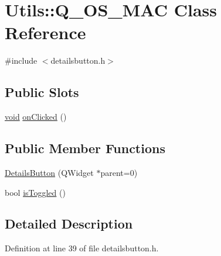 \hypertarget{class_utils_1_1_q___o_s___m_a_c}{\section{\-Utils\-:\-:\-Q\-\_\-\-O\-S\-\_\-\-M\-A\-C \-Class \-Reference}
\label{class_utils_1_1_q___o_s___m_a_c}
}


{\ttfamily \#include $<$detailsbutton.\-h$>$}

\subsection*{\-Public \-Slots}
\begin{DoxyCompactItemize}
\item 
\hyperlink{group___u_a_v_objects_plugin_ga444cf2ff3f0ecbe028adce838d373f5c}{void} \hyperlink{class_utils_1_1_q___o_s___m_a_c_a9ceef4b11c2dba27d8d6a18638c6853a}{on\-Clicked} ()
\end{DoxyCompactItemize}
\subsection*{\-Public \-Member \-Functions}
\begin{DoxyCompactItemize}
\item 
\hyperlink{class_utils_1_1_q___o_s___m_a_c_ae940f49a9ec83eb62c66dbf44ecf3a8f}{\-Details\-Button} (\-Q\-Widget $\ast$parent=0)
\item 
bool \hyperlink{class_utils_1_1_q___o_s___m_a_c_a8af48a4549b49ef89a54eba173171388}{is\-Toggled} ()
\end{DoxyCompactItemize}


\subsection{\-Detailed \-Description}


\-Definition at line 39 of file detailsbutton.\-h.



